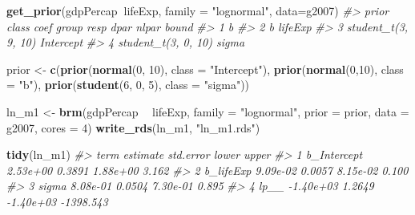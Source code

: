 \documentclass[]{book}
\newenvironment{Shaded}{\begin{snugshade}}{\end{snugshade}}
\newcommand{\KeywordTok}[1]{\textcolor[rgb]{0.13,0.29,0.53}{\textbf{#1}}}
\newcommand{\DataTypeTok}[1]{\textcolor[rgb]{0.13,0.29,0.53}{#1}}
\newcommand{\DecValTok}[1]{\textcolor[rgb]{0.00,0.00,0.81}{#1}}
\newcommand{\StringTok}[1]{\textcolor[rgb]{0.31,0.60,0.02}{#1}}
\newcommand{\CommentTok}[1]{\textcolor[rgb]{0.56,0.35,0.01}{\textit{#1}}}
\newcommand{\OperatorTok}[1]{\textcolor[rgb]{0.81,0.36,0.00}{\textbf{#1}}}
\newcommand{\NormalTok}[1]{#1}
\begin{document}
\begin{Shaded}
\begin{Highlighting}[]
\KeywordTok{get_prior}\NormalTok{(gdpPercap}\OperatorTok{~}\NormalTok{lifeExp, }\DataTypeTok{family =} \StringTok{"lognormal"}\NormalTok{, }\DataTypeTok{data=}\NormalTok{g2007)}
\CommentTok{#>                 prior     class    coef group resp dpar nlpar bound}
\CommentTok{#> 1                             b                                    }
\CommentTok{#> 2                             b lifeExp                            }
\CommentTok{#> 3 student_t(3, 9, 10) Intercept                                    }
\CommentTok{#> 4 student_t(3, 0, 10)     sigma}
\end{Highlighting}
\end{Shaded}

\begin{Shaded}
\begin{Highlighting}[]
\NormalTok{prior <-}\StringTok{ }\KeywordTok{c}\NormalTok{(}\KeywordTok{prior}\NormalTok{(}\KeywordTok{normal}\NormalTok{(}\DecValTok{0}\NormalTok{, }\DecValTok{10}\NormalTok{), }\DataTypeTok{class =} \StringTok{"Intercept"}\NormalTok{),}
           \KeywordTok{prior}\NormalTok{(}\KeywordTok{normal}\NormalTok{(}\DecValTok{0}\NormalTok{,}\DecValTok{10}\NormalTok{), }\DataTypeTok{class =} \StringTok{"b"}\NormalTok{),}
           \KeywordTok{prior}\NormalTok{(}\KeywordTok{student}\NormalTok{(}\DecValTok{6}\NormalTok{, }\DecValTok{0}\NormalTok{, }\DecValTok{5}\NormalTok{), }\DataTypeTok{class =} \StringTok{"sigma"}\NormalTok{))}
\end{Highlighting}
\end{Shaded}

\begin{Shaded}
\begin{Highlighting}[]
\NormalTok{ln_m1 <-}\StringTok{ }\KeywordTok{brm}\NormalTok{(gdpPercap }\OperatorTok{~}\StringTok{ }\NormalTok{lifeExp, }\DataTypeTok{family =} \StringTok{"lognormal"}\NormalTok{, }\DataTypeTok{prior =}\NormalTok{ prior, }\DataTypeTok{data =}\NormalTok{ g2007, }\DataTypeTok{cores =} \DecValTok{4}\NormalTok{)}
\KeywordTok{write_rds}\NormalTok{(ln_m1, }\StringTok{"ln_m1.rds"}\NormalTok{)}
\end{Highlighting}
\end{Shaded}

\begin{Shaded}
\begin{Highlighting}[]
\KeywordTok{tidy}\NormalTok{(ln_m1)}
\CommentTok{#>          term  estimate std.error     lower     upper}
\CommentTok{#> 1 b_Intercept  2.53e+00    0.3891  1.88e+00     3.162}
\CommentTok{#> 2   b_lifeExp  9.09e-02    0.0057  8.15e-02     0.100}
\CommentTok{#> 3       sigma  8.08e-01    0.0504  7.30e-01     0.895}
\CommentTok{#> 4        lp__ -1.40e+03    1.2649 -1.40e+03 -1398.543}
\end{Highlighting}
\end{Shaded}
\end{document}

